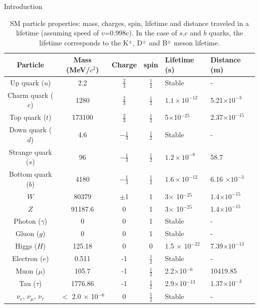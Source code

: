 \begin{chapter}{Introduction}
\begin{table}[htp]
\caption[Table of particles in SM]{SM particle properties: mass, charges, spin, lifetime and distance traveled in a lifetime (assuming speed of $v$=0.998c)\cite{pd}. In the case of $s$,$c$ and $b$ quarks, the lifetime corresponds to the K$^\pm$, D$^{\pm}$ and B$^{\pm}$ meson lifetime.}
\renewcommand{\arraystretch}{1.5}
\begin{tabular}{|c|c|c|c|p{2.5cm}|p{2.5cm}|}
\hline 
Particle& Mass (MeV/$c^2$) &Charge & spin &Lifetime (s) & Distance (m) \\ 
	\hline 
Up quark ($u$)	& 2.2 & $\frac{2}{3}$ & $\frac{1}{2}$ & Stable & -\\ 
	\hline 
Charm quark ($c$)	& 1280 &$\frac{2}{3}$ & $\frac{1}{2}$ & $ 1.1 \times 10^{-12}$ & 5.21$\times 10^{-3}$ \\ 
	\hline 
Top	quark ($t$)& 173100 & $\frac{2}{3}$ & $\frac{1}{2}$ & 5$\times$10$^{-25}$ &2.37$\times 10^{-15}$  \\ 
	\hline 
Down quark ($d$)	& 4.6 &$-\frac{1}{3}$ & $\frac{1}{2}$ & Stable & - \\ 
	\hline 
Strange quark ($s$)	& 96 &$-\frac{1}{3}$ & $\frac{1}{2}$ &$1.2 \times 10^{-8}$ & 58.7 \\ 
	\hline 
Bottom quark ($b$)	& 4180 &$-\frac{1}{3}$ & $\frac{1}{2}$ &$1.6 \times 10^{-12}$  & 6.16 $\times 10^{-3}$\\ 
	\hline 
$W$ 	& 80379 &$\pm$1 & 1 & 3$\times$ 10$^{-25}$ & 1.4$\times 10^{-15}$\\ 
	\hline 
$Z$ & 91187.6 &0 & 1 & 3$\times$ 10$^{-25}$ &1.4$\times 10^{-15}$ \\ 
\hline
Photon ($\gamma$) & 0 &0 & 1&Stable & - \\ 
\hline
Gluon ($g$)	& 0 &0 & 1&Stable & - \\ 
	\hline 
Higgs ($H$)	& 125.18 &0 & 0& 1.5 $\times$ $10^{-22}$ & 7.39$\times 10^{-13}$ \\ 
	\hline 
Electron ($e$)& 0.511 & -1 &  $\frac{1}{2}$& Stable & - \\ 
	\hline 
Muon ($\mu$)	& 105.7 & -1 & $\frac{1}{2}$ & 2.2$\times$10$^{-6}$ & 10419.85 \\ 
	\hline 
Tau ($\tau$)	& 1776.86 &-1 & $\frac{1}{2}$ & 2.9$\times$10$^{-13}$ & 1.37$\times 10^{-3}$\\ 
	\hline 
$\nu_e$, $\nu_\mu$, $\nu_\tau$&  $<$ 2.0 $\times$ 10$^{-6}$ & 0 & $\frac{1}{2}$ & Stable & -\\
	\hline 
\end{tabular} 
\label{SM table}
\end{table}


\end{chapter}
